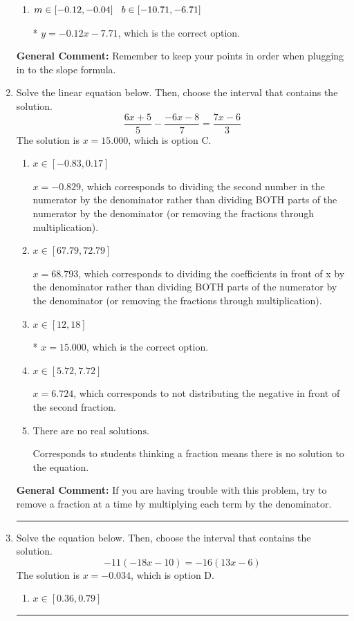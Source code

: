 \documentclass{extbook}[14pt]
\newcommand{\litem}[1]{\item #1

\rule{\textwidth}{0.4pt}}
\begin{document}
\begin{enumerate}
{\begin{enumerate}[label=\Alph*.]
 $y = -0.12x -1$, which corresponds to using the correct slope/equation but not distributing correctly using the second point.
\item \( m \in [-0.12, -0.04] \hspace*{3mm} b \in [-10.71, -6.71] \)

* $y = -0.12x -7.71$, which is the correct option.
\end{enumerate}

\textbf{General Comment:} Remember to keep your points in order when plugging in to the slope formula.
}
\litem{
Solve the linear equation below. Then, choose the interval that contains the solution.
\[ \frac{6x + 5}{5} - \frac{-6x -8}{7} = \frac{7x -6}{3} \]
The solution is \( x = 15.000 \), which is option C.\begin{enumerate}[label=\Alph*.]
\item \( x \in [-0.83, 0.17] \)

 $x = -0.829$, which corresponds to dividing the second number in the numerator by the denominator rather than dividing BOTH parts of the numerator by the denominator (or removing the fractions through multiplication).
\item \( x \in [67.79, 72.79] \)

 $x = 68.793$, which corresponds to dividing the coefficients in front of x by the denominator rather than dividing BOTH parts of the numerator by the denominator (or removing the fractions through multiplication).
\item \( x \in [12, 18] \)

* $x = 15.000$, which is the correct option.
\item \( x \in [5.72, 7.72] \)

 $x = 6.724$, which corresponds to not distributing the negative in front of the second fraction.
\item \( \text{There are no real solutions.} \)

Corresponds to students thinking a fraction means there is no solution to the equation.
\end{enumerate}

\textbf{General Comment:} If you are having trouble with this problem, try to remove a fraction at a time by multiplying each term by the denominator.
}
\litem{
Solve the equation below. Then, choose the interval that contains the solution.
\[ -11(-18x -10) = -16(13x -6) \]
The solution is \( x = -0.034 \), which is option D.\begin{enumerate}[label=\Alph*.]
\item \( x \in [0.36, 0.79] \)


\end{enumerate}}
\end{enumerate}
\end{document}
